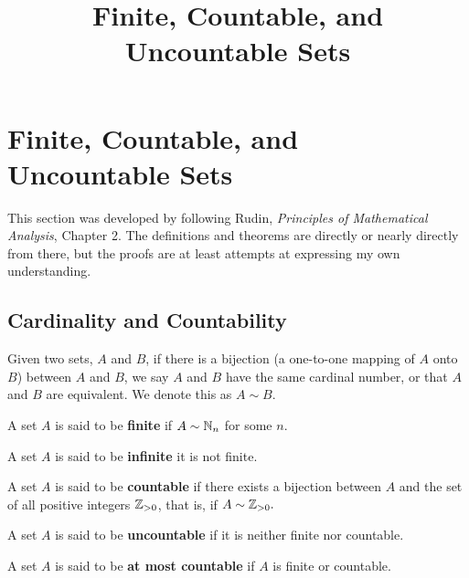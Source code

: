 \documentclass{article}
\title{Finite, Countable, and Uncountable Sets}
\begin{document}
\section{Finite, Countable, and Uncountable Sets}

\begin{note}\label{finite-countable-reference-note}
This section was developed by following Rudin, \emph{Principles of Mathematical Analysis}, Chapter 2. The definitions and theorems are directly or nearly directly from there, but the proofs are at least attempts at expressing my own understanding.
\end{note}

\subsection{Cardinality and Countability}

\begin{definition}
Given two \@{sets}, $A$ and $B$, if there is a bijection (a one-to-one \@{mapping} of $A$ onto $B$) between $A$ and $B$, we say $A$ and $B$ have the same cardinal number, or that $A$ and $B$ are equivalent. We denote this as $A \sim B$.
\end{definition}

\begin{definition}[Finite]
A set $A$ is said to be \textbf{finite} if $A \sim \mathbb{N}_n$ for some $n.$
\end{definition}

\begin{definition}[Infinite]
A set $A$ is said to be \textbf{infinite} it is not \@{finite}.
\end{definition}

\begin{definition}[Countable]
A set $A$ is said to be \textbf{countable} if there exists a bijection between $A$ and the set of all positive \@{integers} $\mathbb{Z}_{>0}$, that is, if $A \sim \mathbb{Z}_{>0}.$
\end{definition}

\begin{definition}[Uncountable]
A set $A$ is said to be \textbf{uncountable} if it is neither \@{finite} nor \@{countable}.
\end{definition}

\begin{definition}
A set $A$ is said to be \textbf{at most countable} if $A$ is \@{finite} or \@{countable}.
\end{definition}
\end{document}
